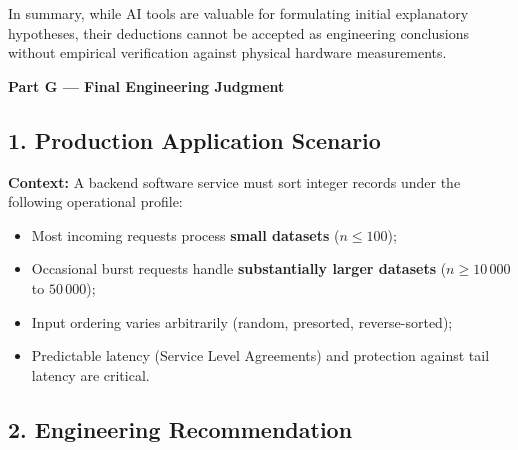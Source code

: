 \documentclass[11pt]{article}
\begin{document}
\noindent In summary, while AI tools are valuable for formulating initial explanatory hypotheses, their deductions cannot be accepted as engineering conclusions without empirical verification against physical hardware measurements.

\newpage
\enlargethispage{2.5\baselineskip}

{\centering\fontsize{15}{18}\selectfont\textbf{Part G --- Final Engineering Judgment}\par}
\vspace{0.6em}

\subsection*{1. Production Application Scenario}
\noindent\textbf{Context:} A backend software service must sort integer records under the following operational profile:
\begin{itemize}[itemsep=0.04em, topsep=0.08em]
    \item Most incoming requests process \textbf{small datasets} ($n \le 100$);
    \item Occasional burst requests handle \textbf{substantially larger datasets} ($n \ge 10\,000$ to $50\,000$);
    \item Input ordering varies arbitrarily (random, presorted, reverse-sorted);
    \item Predictable latency (Service Level Agreements) and protection against tail latency are critical.
\end{itemize}

\subsection*{2. Engineering Recommendation}
\end{document}
